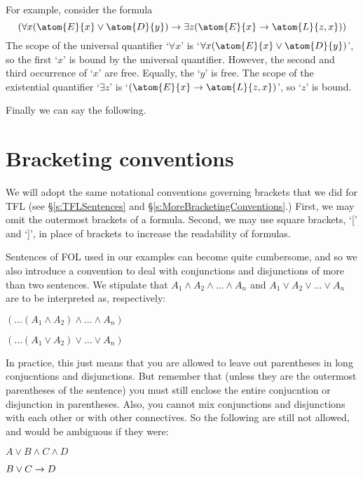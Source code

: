         
For example, consider the formula
	$$(\forall x(\atom{E}{x} \eor \atom{D}{y}) \eif \exists z(\atom{E}{x} \eif \atom{L}{z,x}))$$
The scope of the universal quantifier `$\forall x$' is `$\forall x (\atom{E}{x} \eor \atom{D}{y})$', so the first `$x$' is bound by the universal quantifier. However, the second and third occurrence of `$x$' are free. Equally, the `$y$' is free. The scope of the existential quantifier `$\exists z$' is `$(\atom{E}{x} \eif \atom{L}{z,x})$', so `$z$' is bound.

Finally we can say the following.	


\section{Bracketing conventions}

We will adopt the same notational conventions governing brackets that we did for TFL (see \S\ref{s:TFLSentences} and \S\ref{s:MoreBracketingConventions}.) First, we may omit the outermost brackets of a formula.  Second, we may use square brackets, `[' and `]', in place of brackets to increase the readability of formulas.

Sentences of FOL used in our examples can become quite cumbersome, and so we also introduce a convention to deal with conjunctions and disjunctions of more than two sentences. We stipulate that $A_1 \land A_2 \land \dots \land A_n$ and $A_1 \lor A_2 \lor \dots \lor A_n$ are to be interpreted as, respectively:
\begin{earg}
	\item[] $(\dots(A_1 \land A_2) \land \dots \land A_n)$
	\item[] $(\dots(A_1 \lor A_2) \lor \dots \lor A_n)$
\end{earg}
In practice, this just means that you are allowed to leave out parentheses in long conjucntions and disjunctions. But remember that (unless they are the outermost parentheses of the sentence) you must still enclose the entire conjucntion or disjunction in parentheses. Also, you cannot mix conjunctions and disjunctions with each other or with other connectives. So the following are still not allowed, and would be ambiguous if they were:
\begin{earg}
	\item[] $A \lor B \land C \land D$
	\item[] $B \lor C \rightarrow D$
\end{earg}

